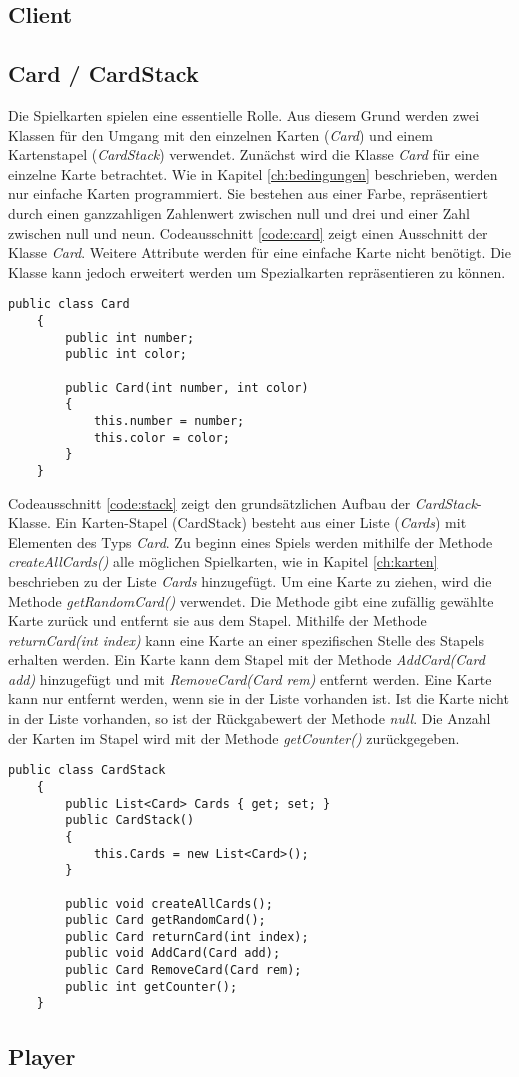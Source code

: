 \subsection{Client}
\subsection{Card / CardStack}
Die Spielkarten spielen eine essentielle Rolle. Aus diesem Grund werden zwei Klassen für den Umgang mit den einzelnen Karten (\textit{Card}) und einem Kartenstapel (\textit{CardStack}) verwendet. Zunächst wird die Klasse \textit{Card} für eine einzelne Karte betrachtet. Wie in Kapitel \ref{ch:bedingungen} beschrieben, werden nur einfache Karten programmiert. Sie bestehen aus einer Farbe, repräsentiert durch einen ganzzahligen Zahlenwert zwischen null und drei und einer Zahl zwischen null und neun. Codeausschnitt \ref{code:card} zeigt einen Ausschnitt der Klasse \textit{Card}. Weitere Attribute werden für eine einfache Karte nicht benötigt. Die Klasse kann jedoch erweitert werden um Spezialkarten repräsentieren zu können.
\begin{lstlisting}[label={code:card}, caption={Codeausschnitt Klasse \textit{Card}}]
	public class Card
	{
		public int number;
		public int color;
		
		public Card(int number, int color)
		{
			this.number = number;
			this.color = color;
		}
	}
\end{lstlisting}
Codeausschnitt \ref{code:stack} zeigt den grundsätzlichen Aufbau der \textit{CardStack}-Klasse. Ein Karten-Stapel (CardStack) besteht aus einer Liste (\textit{Cards}) mit Elementen des Typs \textit{Card}. Zu beginn eines Spiels werden mithilfe der Methode \textit{createAllCards()} alle möglichen Spielkarten, wie in Kapitel \ref{ch:karten} beschrieben zu der Liste \textit{Cards} hinzugefügt. Um eine Karte zu ziehen, wird die Methode \textit{getRandomCard()} verwendet. Die Methode gibt eine zufällig gewählte Karte zurück und entfernt sie aus dem Stapel. Mithilfe der Methode \textit{returnCard(int index)} kann eine Karte an einer spezifischen Stelle des Stapels erhalten werden. Ein Karte kann dem Stapel mit der Methode \textit{AddCard(Card add)} hinzugefügt und mit \textit{RemoveCard(Card rem)} entfernt werden. Eine Karte kann nur entfernt werden, wenn sie in der Liste vorhanden ist. Ist die Karte nicht in der Liste vorhanden, so ist der Rückgabewert der Methode \textit{null}. Die Anzahl der Karten im Stapel wird mit der Methode \textit{getCounter()} zurückgegeben.
\begin{lstlisting}[label={code:stack}, caption={Codeausschnitt Klasse \textit{CardStack}}]
	public class CardStack
	{
		public List<Card> Cards { get; set; }
		public CardStack()
		{
			this.Cards = new List<Card>();
		}
	
		public void createAllCards();
		public Card getRandomCard();
		public Card returnCard(int index);
		public void AddCard(Card add);
		public Card RemoveCard(Card rem);
		public int getCounter();
	}
\end{lstlisting}

\subsection{Player}